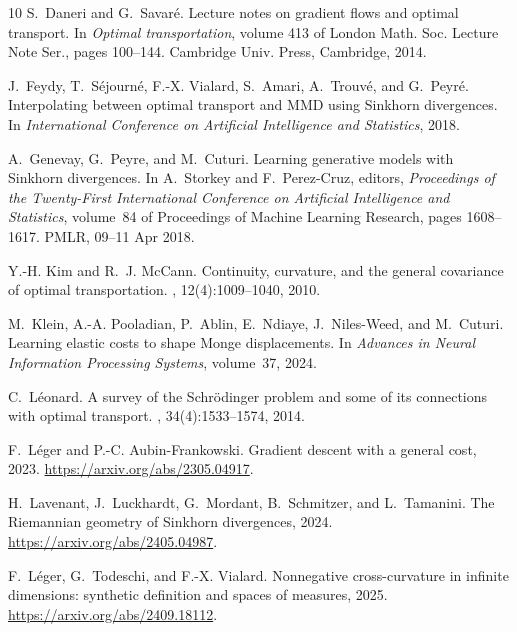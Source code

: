\documentclass[reqno]{amsart}
\theoremstyle{plain}
\theoremstyle{remark}
\theoremstyle{plain}
\numberwithin{equation}{section}
\theoremstyle{remark}
\begin{document}
\begin{thebibliography}{10}
S.~Daneri and G.~Savar\'e.
\newblock Lecture notes on gradient flows and optimal transport.
\newblock In {\em Optimal transportation}, volume 413 of {London Math. Soc.
  Lecture Note Ser.}, pages 100--144. Cambridge Univ. Press, Cambridge, 2014.

J.~Feydy, T.~S{\'e}journ{\'e}, F.-X. Vialard, S.~Amari, A.~Trouv{\'e}, and
  G.~Peyr{\'e}.
\newblock Interpolating between optimal transport and {MMD} using {S}inkhorn
  divergences.
\newblock In {\em International Conference on Artificial Intelligence and
  Statistics}, 2018.

A.~Genevay, G.~Peyre, and M.~Cuturi.
\newblock Learning generative models with {S}inkhorn divergences.
\newblock In A.~Storkey and F.~Perez-Cruz, editors, {\em Proceedings of the
  Twenty-First International Conference on Artificial Intelligence and
  Statistics}, volume~84 of {Proceedings of Machine Learning Research},
  pages 1608--1617. PMLR, 09--11 Apr 2018.




Y.-H. Kim and R.~J. McCann.
\newblock Continuity, curvature, and the general covariance of optimal
  transportation.
, 12(4):1009--1040, 2010.

M.~Klein, A.-A. Pooladian, P.~Ablin, E.~Ndiaye, J.~Niles-Weed, and M.~Cuturi.
\newblock Learning elastic costs to shape {M}onge displacements.
\newblock In {\em Advances in Neural Information Processing Systems}, volume~37, 2024.

C.~L\'eonard.
\newblock A survey of the {S}chr\"odinger problem and some of its connections
  with optimal transport.
, 34(4):1533--1574, 2014.

F.~Léger and P.-C. Aubin-Frankowski.
\newblock Gradient descent with a general cost, 2023.
\newblock \url{https://arxiv.org/abs/2305.04917}.

H.~Lavenant, J.~Luckhardt, G.~Mordant, B.~Schmitzer, and L.~Tamanini.
\newblock The {R}iemannian geometry of {S}inkhorn divergences, 2024.
\newblock \url{https://arxiv.org/abs/2405.04987}.

F.~Léger, G.~Todeschi, and F.-X. Vialard.
\newblock Nonnegative cross-curvature in infinite dimensions: synthetic
  definition and spaces of measures, 2025.
\newblock \url{https://arxiv.org/abs/2409.18112}.


\end{thebibliography}
\end{document}
